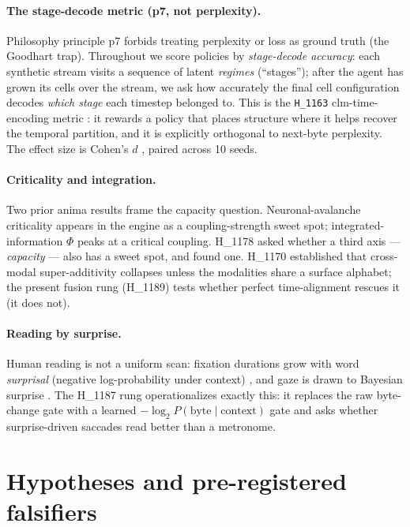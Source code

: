 \documentclass[11pt,a4paper]{article}
\begin{document}
\paragraph{The stage-decode metric (p7, not perplexity).}
Philosophy principle p7 forbids treating perplexity or loss as ground truth (the
Goodhart trap). Throughout we score policies by \emph{stage-decode accuracy}: each
synthetic stream visits a sequence of latent \emph{regimes} (``stages''); after
the agent has grown its cells over the stream, we ask how accurately the final cell
configuration decodes \emph{which stage} each timestep belonged to. This is the
\texttt{H\_1163} clm-time-encoding metric \citep{anima_h1163}: it rewards a policy
that places structure where it helps recover the temporal partition, and it is
explicitly orthogonal to next-byte perplexity. The effect size is Cohen's $d$
\citep{cohen1988statistical}, paired across 10 seeds.

\paragraph{Criticality and integration.}
Two prior anima results frame the capacity question. Neuronal-avalanche
criticality \citep{beggs2003neuronal} appears in the engine as a coupling-strength
sweet spot; integrated-information $\Phi$ \citep{tononi2004information,
albantakis2023iit4} peaks at a critical coupling. H\_1178 asked whether a third
axis --- \emph{capacity} --- also has a sweet spot, and found one. H\_1170
\citep{anima_h1170} established that cross-modal super-additivity collapses unless
the modalities share a surface alphabet; the present fusion rung (H\_1189) tests
whether perfect time-alignment rescues it (it does not).

\paragraph{Reading by surprise.}
Human reading is not a uniform scan: fixation durations grow with word
\emph{surprisal} (negative log-probability under context)
\citep{hale2001probabilistic,smith2013logarithmic}, and gaze is drawn to Bayesian
surprise \citep{itti2009bayesian,rayner2009eye}. The H\_1187 rung operationalizes
exactly this: it replaces the raw byte-change gate with a learned
$-\log_2 P(\text{byte}\mid\text{context})$ gate and asks whether surprise-driven
saccades read better than a metronome.

\section{Hypotheses and pre-registered falsifiers}
\label{sec:hyp}
\end{document}
